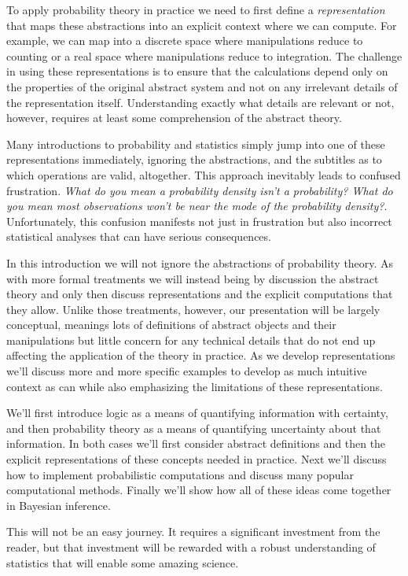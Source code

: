 To apply probability theory in practice we need to first define a \emph{representation} 
that maps these abstractions into an explicit context where we can compute.  
For example, we can map into a discrete space where manipulations reduce 
to counting or a real space where manipulations reduce to integration.  The 
challenge in using these representations is to ensure that the calculations depend 
only on the properties of the original abstract system and not on any irrelevant details
of the representation itself.  Understanding exactly what details are relevant or 
not, however, requires at least some comprehension of the abstract theory.

Many introductions to probability and statistics simply jump into one of these 
representations immediately, ignoring the abstractions, and the subtitles as to
which operations are valid, altogether.  This approach inevitably leads to 
confused frustration.  \emph{What do you mean a probability \emph{density} isn't
a probability?  What do you mean most observations won't be near the mode
of the probability density?}.  Unfortunately, this confusion manifests not just in
frustration but also incorrect statistical analyses that can have serious consequences.

In this introduction we will not ignore the abstractions of probability theory.
As with more formal treatments we will instead being by discussion the abstract
theory and only then discuss representations and the explicit computations that
they allow.   Unlike those treatments, however, our presentation will be largely
conceptual, meanings lots of definitions of abstract objects and their manipulations
but little concern for any technical details that do not end up affecting the
application of the theory in practice.  As we develop representations we'll discuss 
more and more specific examples to develop as much intuitive context as can while 
also emphasizing the limitations of these representations.

We'll first introduce logic as a means of quantifying information with certainty,
and then probability theory as a means of quantifying uncertainty about that 
information.  In both cases we'll first consider abstract definitions and then the 
explicit representations of these concepts needed in practice.  Next we'll discuss 
how to implement probabilistic computations and discuss many popular computational 
methods.  Finally we'll show how all of these ideas come together in Bayesian 
inference.

This will not be an easy journey.  It requires a significant investment from the 
reader, but that investment will be rewarded with a robust understanding of 
statistics that will enable some amazing science. 

